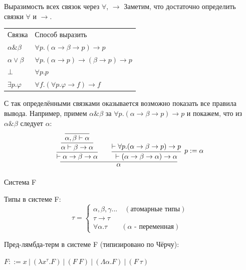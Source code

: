 \documentclass[aspectratio=169]{beamer}
\begin{document}
\begin{frame}[fragile]{Выразимость всех связок через $\forall$, $\rightarrow$}
Заметим, что достаточно определить связки $\forall$ и $\rightarrow$.\vspace{0.5cm}

\begin{tabular}{ll}
 Связка & Способ выразить \\
 $\alpha\&\beta$ & $\forall p.(\alpha\rightarrow\beta\rightarrow p)\rightarrow p$\\
 $\alpha\vee\beta$ & $\forall p.(\alpha\rightarrow p)\rightarrow (\beta\rightarrow p) \rightarrow p$\\
 $\bot$ & $\forall p.p$ \\
 $\exists p.\varphi$ & $\forall f.(\forall p.\varphi\rightarrow f) \rightarrow f$
\end{tabular}

\vspace{0.5cm}
С так определёнными связками оказывается возможно показать все правила вывода.
Например, примем $\alpha\&\beta$ за $\forall p.(\alpha\rightarrow\beta\rightarrow p)\rightarrow p$ и покажем,
что из $\alpha\&\beta$ следует $\alpha$:
$$\infer{\alpha}{
    \infer{\vdash\alpha\rightarrow\beta\rightarrow\alpha}{\infer{\alpha\vdash\beta\rightarrow\alpha}{\infer{\alpha,\beta\vdash\alpha}{}}}\quad\quad
    \infer[p := \alpha]{\vdash(\alpha\rightarrow\beta\rightarrow \alpha)\rightarrow \alpha}{\vdash\forall p.(\alpha\rightarrow\beta\rightarrow p)\rightarrow p}
}$$

\end{frame}

\begin{frame}[fragile]{Система F}
\begin{dfn}
        Типы в системе F:
 	\begin{equation*}
 	\tau =
 	\begin{cases}
 	\alpha,\beta,\gamma ...\quad(\text{атомарные типы}) \\
 	\tau\rightarrow\tau \\
 	\forall\alpha.\tau\qquad(\alpha\text{ - переменная})
 	\end{cases}
 	\end{equation*}
 \end{dfn}

 \begin{dfn}
        Пред-лямбда-терм в системе F (типизировано по Чёрчу):
 	\begin{center}
 		$F ::= x\ |\ (\lambda x^{\tau}.F)\ |\ (F\ F)\ |\ (\Lambda\alpha.F)\ |\ (F\ \tau)$ 
 	\end{center}
 \end{dfn}
\end{frame}
\end{document}
